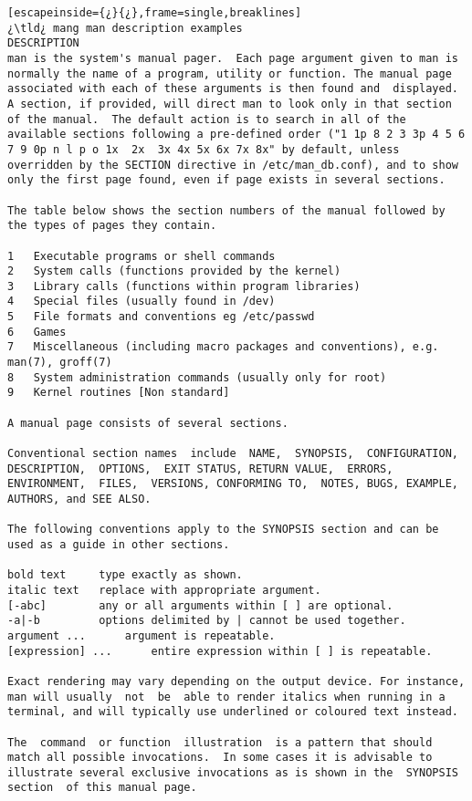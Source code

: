 \begin{lstlisting}[escapeinside={¿}{¿},frame=single,breaklines]
¿\tld¿ mang man description examples
DESCRIPTION
man is the system's manual pager.  Each page argument given to man is normally the name of a program, utility or function. The manual page associated with each of these arguments is then found and  displayed. A section, if provided, will direct man to look only in that section of the manual.  The default action is to search in all of the available sections following a pre-defined order ("1 1p 8 2 3 3p 4 5 6 7 9 0p n l p o 1x  2x  3x 4x 5x 6x 7x 8x" by default, unless overridden by the SECTION directive in /etc/man_db.conf), and to show only the first page found, even if page exists in several sections.

The table below shows the section numbers of the manual followed by the types of pages they contain.

1   Executable programs or shell commands
2   System calls (functions provided by the kernel)
3   Library calls (functions within program libraries)
4   Special files (usually found in /dev)
5   File formats and conventions eg /etc/passwd
6   Games
7   Miscellaneous (including macro packages and conventions), e.g. man(7), groff(7)
8   System administration commands (usually only for root)
9   Kernel routines [Non standard]

A manual page consists of several sections.

Conventional section names  include  NAME,  SYNOPSIS,  CONFIGURATION,  DESCRIPTION,  OPTIONS,  EXIT STATUS, RETURN VALUE,  ERRORS,  ENVIRONMENT,  FILES,  VERSIONS,	CONFORMING TO,	NOTES, BUGS, EXAMPLE, AUTHORS, and SEE ALSO.

The following conventions apply to the SYNOPSIS section and can be used as a guide in other sections.

bold text	  type exactly as shown.
italic text	  replace with appropriate argument.
[-abc]		  any or all arguments within [ ] are optional.
-a|-b		  options delimited by | cannot be used together.
argument ...	  argument is repeatable.
[expression] ...	  entire expression within [ ] is repeatable.

Exact rendering may vary depending on the output device. For instance, man will usually	 not  be  able to render italics when running in a terminal, and will typically use underlined or coloured text instead.

The  command  or function  illustration	 is a pattern that should match all possible invocations.  In some cases it is advisable to illustrate several exclusive invocations as is shown in the  SYNOPSIS  section	of this manual page.
\end{lstlisting}

